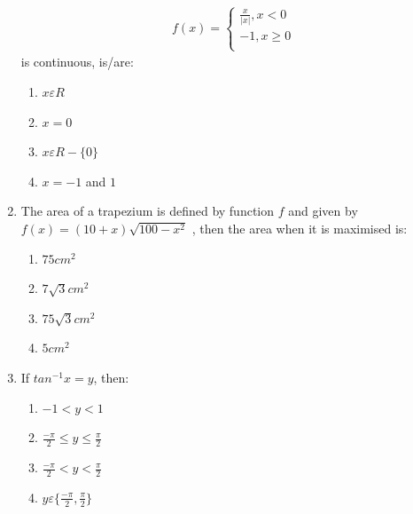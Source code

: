 \documentclass{article}
\begin{document}
\begin{enumerate}
\begin{align*}
f(x) = \begin{cases}
\frac{x}{|x|}, x < 0 \\
-1 , x \geq 0 \\
\end{cases}
\end{align*}
is continuous, is/are:
\begin{enumerate}
     \item $x\varepsilon R$ 
     \item $x = 0$
     \item $x\varepsilon R -\{0\}$ 
     \item $x = -1$ and $1$ 
\end{enumerate}

\item The area of a trapezium is defined by function $f$ and given by $f(x) = (10 + x)\sqrt{100-x^2}$
, then the area when it is maximised is: 
\begin{enumerate}
    \item $75cm^2$
    \item $7\sqrt{3}cm^2$
    \item $75\sqrt{3}cm^2$
    \item $5cm^2$
\end{enumerate}

\item If $tan^{-1} x = y$, then: 
\begin{enumerate}
    \item $-1 < y < 1$
    \item $\frac{-\pi}{2} \leq y \leq \frac{\pi}{2}$
    \item $\frac{-\pi}{2} < y < \frac{\pi}{2}$
    \item $y \varepsilon\{\frac{-\pi}{2},\frac{\pi}{2}\}$
\end{enumerate}


\end{enumerate}
\end{document}
